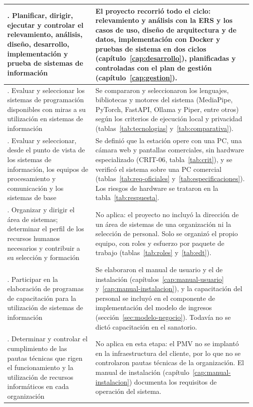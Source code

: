 {\begin{longtable}{>{\raggedright\arraybackslash}p{} >{\raggedright\arraybackslash}p{}}
    4. Planificar, dirigir, ejecutar y controlar el relevamiento, análisis, diseño, desarrollo, implementación y prueba de sistemas de información & El proyecto recorrió todo el ciclo: relevamiento y análisis con la ERS y los casos de uso, diseño de arquitectura y de datos, implementación con Docker y pruebas de sistema en dos ciclos (capítulo~\ref{cap:desarrollo}), planificadas y controladas con el plan de gestión (capítulo~\ref{cap:gestion}). \\ \midrule
    5. Evaluar y seleccionar los sistemas de programación disponibles con miras a su utilización en sistemas de información & Se compararon y seleccionaron los lenguajes, bibliotecas y motores del sistema (MediaPipe, PyTorch, FastAPI, Ollama y Piper, entre otros) según los criterios de ejecución local y privacidad (tablas~\ref{tab:tecnologias} y~\ref{tab:comparativa}). \\ \midrule
    6. Evaluar y seleccionar, desde el punto de vista de los sistemas de información, los equipos de procesamiento y comunicación y los sistemas de base & Se definió que la estación opere con una PC, una cámara web y pantallas comerciales, sin hardware especializado (CRIT-06, tabla~\ref{tab:crit}), y se verificó el sistema sobre una PC comercial (tablas~\ref{tab:req-oficiales} y~\ref{tab:especificaciones}). Los riesgos de hardware se trataron en la tabla~\ref{tab:respuesta}. \\ \midrule
    7. Organizar y dirigir el área de sistemas; determinar el perfil de los recursos humanos necesarios y contribuir a su selección y formación & No aplica: el proyecto no incluyó la dirección de un área de sistemas de una organización ni la selección de personal. Solo se organizó el propio equipo, con roles y esfuerzo por paquete de trabajo (tablas~\ref{tab:roles} y~\ref{tab:edt}). \\ \midrule
    8. Participar en la elaboración de programas de capacitación para la utilización de sistemas de información & Se elaboraron el manual de usuario y el de instalación (capítulos~\ref{cap:manual-usuario} y~\ref{cap:manual-instalacion}), y la capacitación del personal se incluyó en el componente de implementación del modelo de ingresos (sección~\ref{sec:modelo-negocio}). Todavía no se dictó capacitación en el sanatorio. \\ \midrule
    9. Determinar y controlar el cumplimiento de las pautas técnicas que rigen el funcionamiento y la utilización de recursos informáticos en cada organización & No aplica en esta etapa: el PMV no se implantó en la infraestructura del cliente, por lo que no se controlaron pautas técnicas de la organización. El manual de instalación (capítulo~\ref{cap:manual-instalacion}) documenta los requisitos de operación del sistema. \\ \midrule

\end{longtable}}
